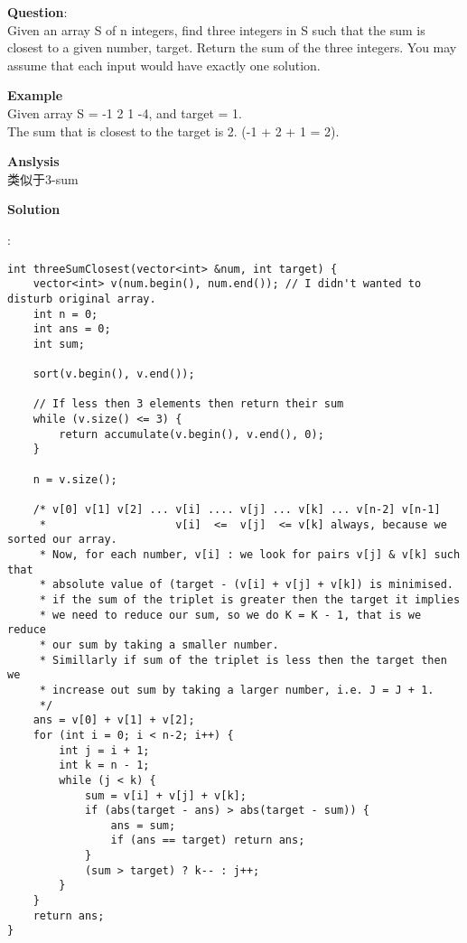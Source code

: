     
\begin{description}
    \item{\textbf{Question}}:\\%
		Given an array S of n integers, find three integers in S such that the sum is closest to a given number, target. Return the sum of the three integers. You may assume that each input would have exactly one solution.\\

    \item{\textbf{Example}}\\
		Given array S = {-1 2 1 -4}, and target = 1.\\
		The sum that is closest to the target is 2. (-1 + 2 + 1 = 2).\\

    \item{\textbf{Anslysis}}\\
		类似于3-sum\\

    \item{\textbf{Solution}}\\
	\item{} : \\
		\begin{lstlisting}
int threeSumClosest(vector<int> &num, int target) {        
    vector<int> v(num.begin(), num.end()); // I didn't wanted to disturb original array.
    int n = 0;
    int ans = 0;
    int sum;

    sort(v.begin(), v.end());

    // If less then 3 elements then return their sum
    while (v.size() <= 3) {
        return accumulate(v.begin(), v.end(), 0);
    }

    n = v.size();

    /* v[0] v[1] v[2] ... v[i] .... v[j] ... v[k] ... v[n-2] v[n-1]
     *                    v[i]  <=  v[j]  <= v[k] always, because we sorted our array. 
     * Now, for each number, v[i] : we look for pairs v[j] & v[k] such that 
     * absolute value of (target - (v[i] + v[j] + v[k]) is minimised.
     * if the sum of the triplet is greater then the target it implies
     * we need to reduce our sum, so we do K = K - 1, that is we reduce
     * our sum by taking a smaller number.
     * Simillarly if sum of the triplet is less then the target then we
     * increase out sum by taking a larger number, i.e. J = J + 1.
     */
    ans = v[0] + v[1] + v[2];
    for (int i = 0; i < n-2; i++) {
        int j = i + 1;
        int k = n - 1;
        while (j < k) {
            sum = v[i] + v[j] + v[k];
            if (abs(target - ans) > abs(target - sum)) {
                ans = sum;
                if (ans == target) return ans;
            }
            (sum > target) ? k-- : j++;
        }
    }
    return ans;
}
		\end{lstlisting}

\end{description}

